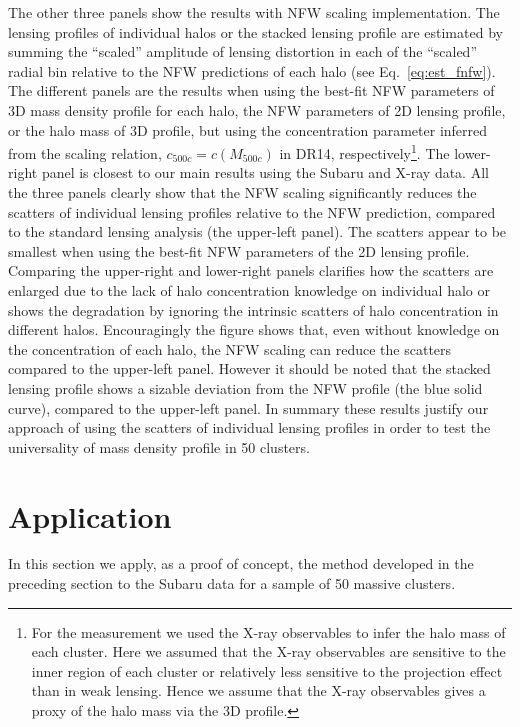 \documentclass[iop, apj]{emulateapj}
\newcommand{\?}{\stackrel{?}{=}}
\begin{document}
The other three panels show the results with NFW scaling
implementation. The lensing profiles of individual halos or the stacked
lensing profile are estimated by summing the ``scaled'' amplitude of
lensing distortion in each of the ``scaled'' radial bin relative to the
NFW predictions of each halo (see Eq.~\ref{eq:est_fnfw}).  The different
panels are the results when using the best-fit NFW parameters of 3D mass
density profile for each halo, the NFW parameters of 2D lensing profile,
or the halo mass of 3D profile, but using the concentration parameter
inferred from the scaling relation, $c_{500c}=c(M_{500c})$ in DR14,
respectively\footnote{For the measurement we used the X-ray observables
to infer the halo mass of each cluster. Here we assumed that the X-ray
observables are sensitive to the inner region of each cluster or
relatively less sensitive to the projection effect than in weak
lensing. Hence we assume that the X-ray observables gives a proxy of the
halo mass via the 3D profile.}. The lower-right panel is closest to our
main results using the Subaru and X-ray data.  All the three panels
clearly show that the NFW scaling significantly reduces the scatters of
individual lensing profiles relative to the NFW prediction, compared to
the standard lensing analysis (the upper-left panel). The scatters
appear to be smallest when using the best-fit NFW parameters of the 2D
lensing profile. Comparing the upper-right and lower-right panels
clarifies how the scatters are enlarged due to the lack of halo
concentration knowledge on individual halo or shows the degradation by
ignoring the intrinsic scatters of halo concentration in different
halos. Encouragingly the figure shows that, even without knowledge on
the concentration of each halo, the NFW scaling can reduce the scatters
compared to the upper-left panel.  However it should be noted that the
stacked lensing profile shows a sizable deviation from the NFW profile
(the blue solid curve), compared to the upper-left panel. In summary
these results justify our approach of using the scatters of individual
lensing profiles in order to test the universality of mass density
profile in 50 clusters.

\section{Application}
\label{sec:results}

In this section we apply, as a proof of concept, the method developed in
the preceding section to the Subaru data for a sample of 50 massive
clusters.
\end{document}
